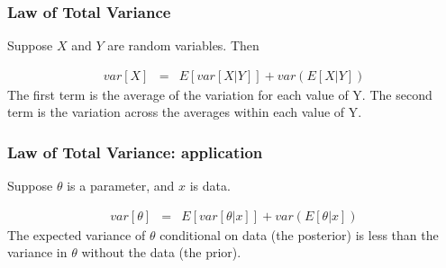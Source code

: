 \documentclass{beamer}
\numberwithin{equation}{section}
\begin{document}
\begin{frame}
\frametitle{Law of Total Variance}
Suppose $X$ and $Y$ are random variables.  Then 

\begin{eqnarray}
var[X] & = & E[var[X|Y]]+var(E[X|Y]) \nonumber 
\end{eqnarray}
The first term is the average of the variation for each value of Y.\pause
The second term is the variation across the averages within each value of Y.
\end{frame}

\begin{frame}
\frametitle{Law of Total Variance: application}
Suppose $\theta$ is a parameter, and $x$ is data.

\begin{eqnarray}
var[\theta] & = & E[var[\theta|x]]+var(E[\theta|x]) \nonumber 
\end{eqnarray}
The expected variance of $\theta$ conditional on data (the posterior) is less than the variance in $\theta$ without the data (the prior).
\end{frame}
\end{document}
